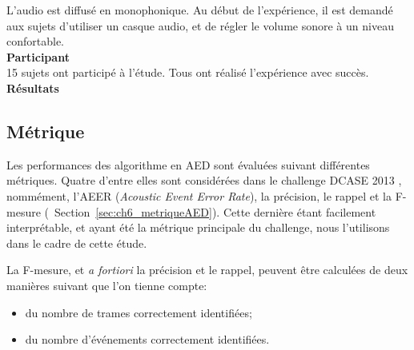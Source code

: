 L'audio est diffusé en monophonique. Au début de l'expérience, il est demandé aux sujets d'utiliser un casque audio, et de régler le volume sonore à un niveau confortable.  \\

\textbf{Participant} \\

15 sujets ont participé à l'étude. Tous ont réalisé l'expérience avec succès. \\

\textbf{Résultats} \\


\subsection{Métrique}

Les performances des algorithme en AED sont évaluées suivant différentes métriques. Quatre d'entre elles sont considérées dans le challenge DCASE 2013 \citep{Giannoulis:2013a,Stowell15}, nommément, l'AEER (\emph{Acoustic Event Error Rate}), la précision, le rappel et la F-mesure (\cf~Section~\ref{sec:ch6_metriqueAED}). Cette dernière étant facilement interprétable, et ayant été la métrique principale du challenge, nous l'utilisons dans le cadre de cette étude.

La F-mesure, et \emph{a fortiori} la précision et le rappel, peuvent être calculées de deux manières suivant que l'on tienne compte: 

\begin{itemize}
\item du nombre de trames correctement identifiées;
\item du nombre d'événements correctement identifiées.
\end{itemize}

